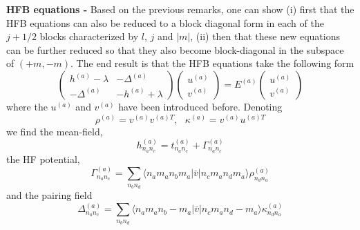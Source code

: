 {\bf HFB equations - } Based on the previous remarks, one can show (i) first 
that the HFB equations can also be reduced to a block diagonal form in each of 
the $j+1/2$ blocks characterized by $l$, $j$ and $|m|$, (ii) then that these 
new equations can be further reduced so that they also become block-diagonal in 
the subspace of $(+m,-m)$. The end result is that the HFB equations take the 
following form
\begin{equation}
\left( \begin{array}{cc}
h^{(a)} - \lambda & -\Delta^{(a)} \\
-\Delta^{(a)} & -h^{(a)} + \lambda
\end{array} \right)
\left( \begin{array}{cc} 
u^{(a)} \\ 
v^{(a)} 
\end{array} \right)
= E^{(a)}
\left( \begin{array}{c} 
u^{(a)} \\ 
v^{(a)} 
\end{array} \right)
\end{equation}
where the $u^{(a)}$ and $v^{(a)}$ have been introduced before. Denoting
\begin{equation}
\rho^{(a)} = v^{(a)}v^{(a)T}, \ \ \ \kappa^{(a)} = v^{(a)}u^{(a)T}
\end{equation}
we find the mean-field,
\begin{equation}
h_{n_{a}n_{c}}^{(a)} = t_{n_{a}n_{c}}^{(a)} + \Gamma_{n_{a}n_{c}}^{(a)} 
\end{equation}
the HF potential,
\begin{equation}
\Gamma_{n_{a}n_{c}}^{(a)} =
\sum_{n_{b}n_{d}} 
\langle n_{a}m_{a} n_{b}m_{a} | \bar{v} | n_{c}m_{a} n_{d}m_{a}\rangle
\rho^{(a)}_{n_{d}n_{a}}
\end{equation}
and the pairing field
\begin{equation}
\Delta_{n_{a}n_{c}}^{(a)} =
\sum_{n_{b}n_{d}} 
\langle n_{a}m_{a} n_{b}-m_{a} | \bar{v} | n_{c}m_{a} n_{d}-m_{a}\rangle
\kappa^{(a)}_{n_{d}n_{a}}
\end{equation}


